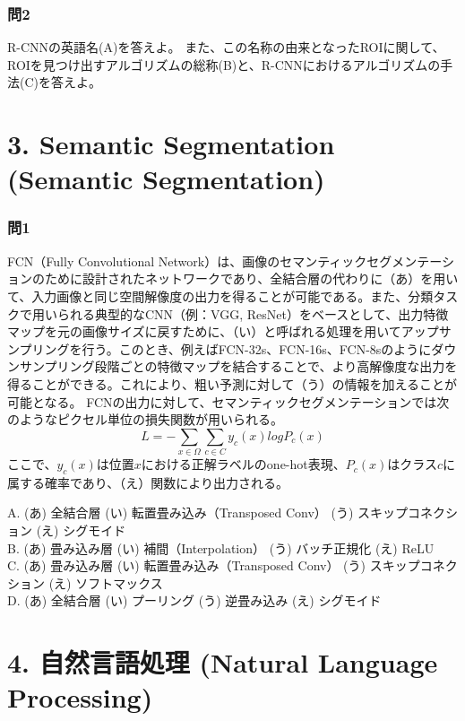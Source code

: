 \documentclass[
  letterpaper,
  DIV=11,
  numbers=noendperiod]{scrreprt}
\begin{document}
\subsection{問2}\label{ux554f2-2}

R-CNNの英語名(A)を答えよ。
また、この名称の由来となったROIに関して、ROIを見つけ出すアルゴリズムの総称(B)と、R-CNNにおけるアルゴリズムの手法(C)を答えよ。

\chapter{3. Semantic Segmentation (Semantic
Segmentation)}\label{semantic-segmentation-semantic-segmentation}

\subsection{問1}\label{ux554f1-4}

FCN（Fully Convolutional
Network）は、画像のセマンティックセグメンテーションのために設計されたネットワークであり、全結合層の代わりに（あ）を用いて、入力画像と同じ空間解像度の出力を得ることが可能である。また、分類タスクで用いられる典型的なCNN（例：VGG,
ResNet）をベースとして、出力特徴マップを元の画像サイズに戻すために、（い）と呼ばれる処理を用いてアップサンプリングを行う。このとき、例えばFCN-32s、FCN-16s、FCN-8sのようにダウンサンプリング段階ごとの特徴マップを結合することで、より高解像度な出力を得ることができる。これにより、粗い予測に対して（う）の情報を加えることが可能となる。
FCNの出力に対して、セマンティックセグメンテーションでは次のようなピクセル単位の損失関数が用いられる。
\[
𝐿=−∑_{𝑥∈Ω}∑_{c∈C}y_c(x)logP_c(x)
\]
ここで、\(y_c(x)\)は位置\(x\)における正解ラベルのone-hot表現、\(P_c(x)\)はクラス\(c\)に属する確率であり、（え）関数により出力される。

A. (あ) 全結合層 (い) 転置畳み込み（Transposed Conv） (う)
スキップコネクション (え) シグモイド\\
B. (あ) 畳み込み層 (い) 補間（Interpolation） (う) バッチ正規化 (え)
ReLU\\
C. (あ) 畳み込み層 (い) 転置畳み込み（Transposed Conv） (う)
スキップコネクション (え) ソフトマックス\\
D. (あ) 全結合層 (い) プーリング (う) 逆畳み込み (え) シグモイド

\chapter{4. 自然言語処理 (Natural Language
Processing)}\label{ux81eaux7136ux8a00ux8a9eux51e6ux7406-natural-language-processing}
\end{document}
